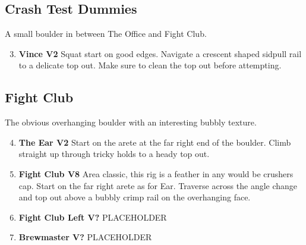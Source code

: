 \subsection*{Crash Test Dummies}\label{bf:Crash Test Dummies}
A small boulder in between The Office and Fight Club.

\begin{enumerate}[]
	\setcounter{enumi}{2}
	\item\label{rt:Vince} \colorbox{green!20}{\textbf{Vince V2    } }
	\newline Squat start on good edges. Navigate a crescent shaped sidpull rail to a delicate top out. Make sure to clean the top out before attempting.\
\end{enumerate}
\subsection*{Fight Club}\label{bf:Fight Club}
The obvious overhanging boulder with an interesting bubbly texture.

\label{pt:Fight Club}
\begin{enumerate}[]
	\setcounter{enumi}{3}
	\item\label{rt:The Ear} \colorbox{green!20}{\textbf{The Ear V2     } }
	\newline Start on the arete at the far right end of the boulder. Climb straight up through tricky holds to a heady top out.\
	\setcounter{enumi}{4}
	\item\label{rt:Fight Club} \colorbox{Goldenrod!50}{\textbf{Fight Club V8 \ding{72} \ding{72} \ding{72}  } }
	\newline Area classic, this rig is a feather in any would be crushers cap. Start on the far right arete as for Ear. Traverse across the angle change and top out above a bubbly crimp rail on the overhanging face.\
	\setcounter{enumi}{5}
	\item\label{rt:Fight Club Left} \colorbox{black!20}{\textbf{Fight Club Left V?  } }
	\newline PLACEHOLDER\
	\setcounter{enumi}{6}
	\item\label{rt:Brewmaster} \colorbox{black!20}{\textbf{Brewmaster V?  } }
	\newline PLACEHOLDER\
\end{enumerate}
